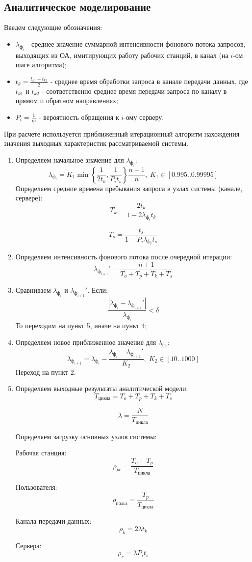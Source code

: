 \documentclass[russian,utf8,emptystyle]{eskdtext}
\begin{document}
\subsection{Аналитическое моделирование}
Введем следующие обозначения:
\begin{itemize}[label=-]
\item $\lambda_{\text{ф}_i}$ - среднее значение суммарной интенсивности фонового потока запросов, выходящих из ОА, имитирующих работу рабочих станций, в канал (на $i$-ом шаге алгоритма);
\item $t_k = \frac{t_{k1} + t_{k2}}{2}$ - среднее время обработки запроса в канале передачи данных, где $t_{k1}$ и $t_{k2}$ - соответственно среднее время передачи запроса по каналу в прямом и обратном направлениях;
\item $P_i = \frac{1}{m}$ - вероятность обращения к $i$-ому серверу.
\end{itemize}

При расчете используется приближенный итерационный алгоритм нахождения значения выходных характеристик рассматриваемой системы.

\begin{enumerate}[label=\arabic*)]
\item Определяем начальное значение для $\lambda_{\text{ф}_i}$:
$$
\lambda_{\text{ф}_i} = K_1 \min \left\{ \frac{1}{2t_k}, \frac{1}{P_i t_s} \right\} \frac{n - 1}{n}, \; K_1 \in [0.995 .. 0.99995]
$$
Определяем средние времена пребывания запроса в узлах системы (канале, сервере):
$$
T_k = \frac{2t_k}{1 - 2\lambda_{\text{ф}_i}t_k}
$$

$$
T_s = \frac{t_s}{1 - P_i \lambda_{\text{ф}_i} t_s}
$$

\item Определяем интенсивность фонового потока после очередной итерации:
$$
\lambda_{\text{ф}_{i+1}}' = \frac{n+1}{T_o + T_p + T_k + T_s}
$$

\item Сравниваем $\lambda_{\text{ф}_i}$ и $\lambda_{\text{ф}_{i+1}}'$. Если:
$$
    \frac{| \lambda_{\text{ф}_i} - \lambda_{\text{ф}_{i+1}}' |}{\lambda_{\text{ф}_i}} < \delta
$$
То переходим на пункт 5, иначе на пункт 4;

\item Определяем новое приближенное значение для $\lambda_{\text{ф}_i}$:
$$
\lambda_{\text{ф}_{i+1}} = \lambda_{\text{ф}_i} - \frac{\lambda_{\text{ф}_i} - \lambda_{\text{ф}_{i+1}}'}{K_2}, \; K_2 \in [10 .. 1000]
$$
Переход на пункт 2.

\item Определяем выходные результаты аналитической модели:
$$
T_\text{цикла} = T_o + T_p + T_k + T_s
$$

$$
\lambda = \frac{N}{T_\text{цикла}}
$$

Определяем загрузку основных узлов системы:

Рабочая станция:
$$
    \rho_{pc} = \frac{T_o + T_p}{T_\text{цикла}}
$$

Пользователя:
$$
    \rho_\text{польз} = \frac{T_p}{T_\text{цикла}}
$$

Канала передачи данных:
$$
    \rho_k = 2 \lambda t_k
$$

Сервера:
$$
    \rho_s = \lambda P_i t_s
$$
\end{enumerate}
\end{document}
